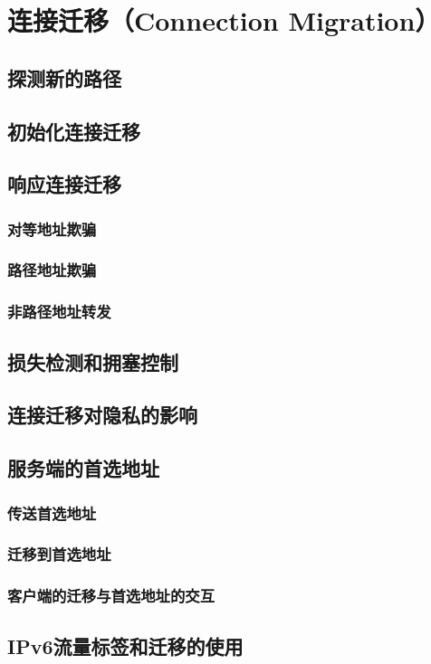 \section{连接迁移（Connection Migration）}

\subsection{探测新的路径}

\subsection{初始化连接迁移}

\subsection{响应连接迁移}

\subsubsection{对等地址欺骗}
\subsubsection{路径地址欺骗}
\subsubsection{非路径地址转发}

\subsection{损失检测和拥塞控制}

\subsection{连接迁移对隐私的影响}

\subsection{服务端的首选地址}

\subsubsection{传送首选地址}
\subsubsection{迁移到首选地址}
\subsubsection{客户端的迁移与首选地址的交互}

\subsection{IPv6流量标签和迁移的使用}